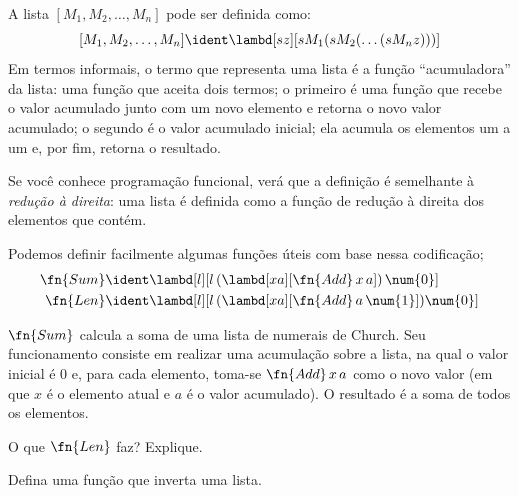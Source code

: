 \documentclass[../../../include/open-logic-section]{subfiles}
\begin{document}

A lista $[M_1, M_2, \ldots, M_n]$ pode ser definida como:
\[
  [M_1, M_2, \ldots, M_n] \ident \lambd[sz][s M_1 (s M_2 (\ldots (s M_n z)))]
\]
Em termos informais, o termo que representa uma lista é a função
``acumuladora'' da lista: uma função que aceita dois termos; o primeiro
é uma função que recebe o valor acumulado junto com um novo elemento e
retorna o novo valor acumulado; o segundo é o valor acumulado inicial;
ela acumula os elementos um a um e, por fim, retorna o resultado.

\begin{digress}
  Se você conhece programação funcional, verá que a definição é semelhante
  à \emph{redução à direita}: uma lista é definida como a função de
  redução à direita dos elementos que contém.
\end{digress}

Podemos definir facilmente algumas funções úteis com base nessa codificação; 
\begin{align*}
  \fn{Sum} & \ident
  \lambd[l][l \, (\lambd[xa][\fn{Add} \, x \, a])\,  \num{0}]\\
  \fn{Len} & \ident
  \lambd[l][l \, (\lambd[xa][\fn{Add} \, a \, \num{1}]) \num{0}]
\end{align*}

$\fn{Sum}$ calcula a soma de uma lista de numerais de Church. Seu funcionamento
consiste em realizar uma acumulação sobre a lista, na qual o valor inicial é
$\num{0}$ e, para cada elemento, toma-se $\fn{Add} \, x\, a$ como o novo
valor (em que $x$ é o elemento atual e $a$ é o valor acumulado). O resultado
é a soma de todos os elementos.

\begin{prob}
  O que $\fn{Len}$ faz? Explique.
\end{prob}

\begin{prob}
  Defina uma função que inverta uma lista.
\end{prob}
\end{document}
